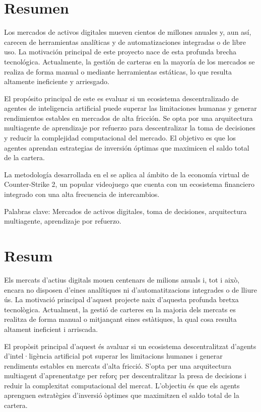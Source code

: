 \chapter*{Resumen}

Los mercados de activos digitales mueven cientos de millones anuales y, aun así, carecen de herramientas analíticas y de automatizaciones integradas o de libre uso. La motivación principal de este proyecto nace de esta profunda brecha tecnológica. Actualmente, la gestión de carteras en la mayoría de los mercados se realiza de forma manual o mediante herramientas estáticas, lo que resulta altamente ineficiente y arriesgado.

El propósito principal de este  es evaluar si un ecosistema descentralizado de agentes de inteligencia artificial puede superar las limitaciones humanas y generar rendimientos estables en mercados de alta fricción. Se opta por una arquitectura multiagente de aprendizaje por refuerzo para descentralizar la toma de decisiones y reducir la complejidad computacional del mercado. El objetivo es que los agentes aprendan estrategias de inversión óptimas que maximicen el saldo total de la cartera.

La metodología desarrollada en el  se aplica al ámbito de la economía virtual de Counter-Strike 2, un popular videojuego que cuenta con un ecosistema financiero integrado con una alta frecuencia de intercambios.

Palabras clave: Mercados de activos digitales, toma de decisiones, arquitectura multiagente, aprendizaje por refuerzo.

\chapter*{Resum}

Els mercats d'actius digitals mouen centenars de milions anuals i, tot i això, encara no disposen d'eines analítiques ni d'automatitzacions integrades o de lliure ús. La motivació principal d'aquest projecte naix d'aquesta profunda bretxa tecnològica. Actualment, la gestió de carteres en la majoria dels mercats es realitza de forma manual o mitjançant eines estàtiques, la qual cosa resulta altament ineficient i arriscada.

El propòsit principal d'aquest  és avaluar si un ecosistema descentralitzat d'agents d'intel·ligència artificial pot superar les limitacions humanes i generar rendiments estables en mercats d'alta fricció. S'opta per una arquitectura multiagent d'aprenentatge per reforç per descentralitzar la presa de decisions i reduir la complexitat computacional del mercat. L'objectiu és que els agents aprenguen estratègies d'inversió òptimes que maximitzen el saldo total de la cartera.


